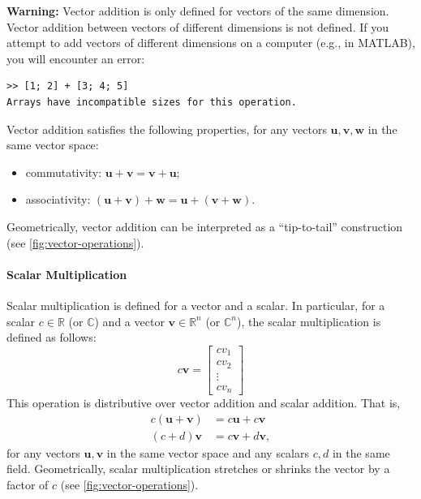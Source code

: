 \begin{warningBox}
  \textbf{Warning:} Vector addition is only defined for vectors of the same dimension. Vector addition between vectors of different dimensions is not defined. If you attempt to add vectors of different dimensions on a computer (e.g., in MATLAB), you will encounter an error:
\begin{verbatim}
>> [1; 2] + [3; 4; 5]
Arrays have incompatible sizes for this operation.
\end{verbatim}
\end{warningBox}

Vector addition satisfies the following properties, for any vectors $ \mathbf{u}, \mathbf{v}, \mathbf{w} $ in the same vector space:
\begin{itemize}
    \item commutativity: $ \mathbf{u} + \mathbf{v} = \mathbf{v} + \mathbf{u} $;
    \item associativity: $ (\mathbf{u} + \mathbf{v}) + \mathbf{w} = \mathbf{u} + (\mathbf{v} + \mathbf{w}) $.
\end{itemize}

Geometrically, vector addition can be interpreted as a ``tip-to-tail'' construction (see \autoref{fig:vector-operations}).

\paragraph*{Scalar Multiplication}
Scalar multiplication is defined for a vector and a scalar.
In particular, for a scalar $ c \in \mathbb{R} $ (or $ \mathbb{C} $) and a vector $ \mathbf{v}\in\mathbb{R}^{n} $ (or $\mathbb{C}^n$), the scalar multiplication is defined as follows:
\begin{equation*}
    c\mathbf{v} = \begin{bmatrix} c v_1 \\ c v_2 \\ \vdots \\ c v_n \end{bmatrix}
\end{equation*}
This operation is distributive over vector addition and scalar addition. That is,
\begin{align*}
  c(\mathbf{u} + \mathbf{v}) &= c\mathbf{u} + c\mathbf{v} \\
  (c + d)\mathbf{v} &= c\mathbf{v} + d\mathbf{v},
\end{align*}
for any vectors $ \mathbf{u}, \mathbf{v} $ in the same vector space and any scalars $ c, d $ in the same field.
Geometrically, scalar multiplication stretches or shrinks the vector by a factor of $ c $ (see \autoref{fig:vector-operations}).

